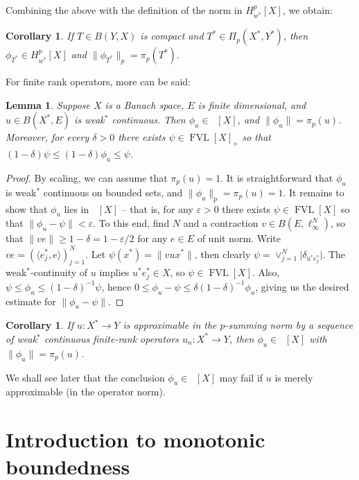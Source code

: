 \documentclass{amsart}
\theoremstyle{plain}
\newtheorem{corollary}[theorem]{Corollary}
\newtheorem{lemma}[theorem]{Lemma}
\theoremstyle{definition}
\numberwithin{equation}{section}
\newcommand{\vr}{\varepsilon}
\DeclareMathOperator{\FVL}{FVL}
\DeclareMathOperator{\FBLp}{FBL^{\mathit{(p)}}}
\newcommand{\Hp}{H_{w^*}^{p}}
\begin{document}
Combining the above with the definition of the norm in $\Hp[X]$, we obtain:

\begin{corollary}\label{compact_adjoint}
    If $T \in B(Y, X)$ is compact and $T^* \in \Pi_p(X^*, Y^*)$, then $\phi_{T^*} \in \Hp[X]$ and $\|\phi_{T^*}\|_p = \pi_p(T^*)$.
\end{corollary}

For finite rank operators, more can be said:

\begin{lemma}\label{fin rank ops}
Suppose $X$ is a Banach space, $E$ is finite dimensional, and $u \in B(X^*,E)$ is weak$^*$ continuous. Then $\phi_u \in \FBLp[X]$, and $\|\phi_u\| = \pi_p(u)$. Moreover, for every $\delta > 0$ there exists $\psi \in \FVL[X]_+$ so that $(1-\delta) \psi \leq (1-\delta) \phi_u \leq \psi$.
\end{lemma}

\begin{proof}
By scaling, we can assume that $\pi_p(u) = 1$. It is straightforward that $\phi_u$ is weak$^*$ continuous on bounded sets, and $\|\phi_u\|_{p} = \pi_p(u) = 1$. It remains to show that $\phi_u$ lies in $\FBLp[X]$ -- that is, for any $\vr > 0$ there exists $\psi \in \FVL[X]$ so that $\|\phi_u - \psi\| < \vr$.
To this end, find $N$ and a contraction $v \in B(E,\ell_\infty^N)$, so that $\|ve\| \geq 1 - \delta = 1 - \vr/2$ for any $e \in E$ of unit norm. Write $ve = (\langle e_j^*,e \rangle)_{j=1}^N$. Let $\psi(x^*) = \|vux^*\|$, then clearly $\psi = \vee_{j=1}^N \big| \delta_{u^* e_j^*} \big|$.
The weak$^*$-continuity of $u$ implies $u^* e_j^* \in X$, so $\psi \in \FVL[X]$. Also, $\psi \leq \phi_u \leq (1-\delta)^{-1} \psi$, hence $0 \leq \phi_u - \psi \leq \delta(1-\delta)^{-1} \phi_u$, giving us the desired estimate for $\|\phi_u - \psi\|$.
\end{proof}

\begin{corollary}\label{nuclear in FBL}
    If $u: X^* \to Y$ is approximable in the $p$-summing norm by a sequence of weak$^*$ continuous finite-rank operators $u_n : X^* \to Y$, then $\phi_u \in \FBLp[X]$ with $\|\phi_u\| = \pi_p(u)$.
\end{corollary}

We shall see later that the conclusion $\phi_u \in \FBLp[X]$ may fail if $u$ is merely approximable (in the operator norm).

\section{Introduction to monotonic boundedness}\label{m-b}
\end{document}
